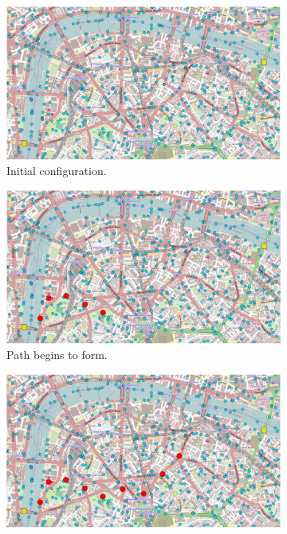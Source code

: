 \begin{figure}
    \centering
    \begin{subfigure}[b]{.49\textwidth}
        \centering
        \includegraphics[width=\textwidth]{figures/protelis-example-a.png}
        \caption{Initial configuration.}
        \label{fig:protelis-example-a}
    \end{subfigure}
    \hfill
    \begin{subfigure}[b]{.49\textwidth}
        \centering
        \includegraphics[width=\textwidth]{figures/protelis-example-b.png}
        \caption{Path begins to form.}
        \label{fig:protelis-example-b}
    \end{subfigure}
    \hfill
    \begin{subfigure}[b]{.49\textwidth}
        \centering
        \includegraphics[width=\textwidth]{figures/protelis-example-c.png}

\end{subfigure}
\end{figure}
